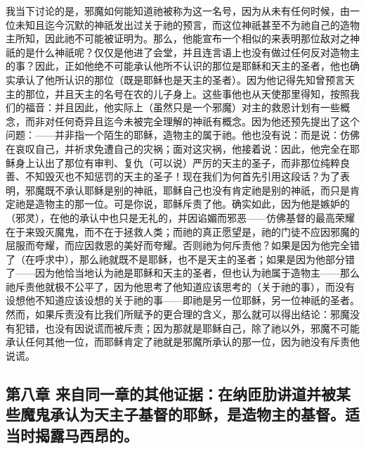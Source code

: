 我当下讨论的是，邪魔如何能知道祂被称为这一名号，因为从未有任何时候，由一位未知且迄今沉默的神祇发出过关于祂的预言，而这位神祇甚至不为祂自己的造物主所知，因此祂不可能被证明为。那么，他能宣布一个相似的来表明那位敌对之神祇的是什么神祇呢？仅仅是他进了会堂，并且连言语上也没有做过任何反对造物主的事？因此，正如他绝不可能承认他所不认识的那位是耶稣和天主的圣者，他也确实承认了他所认识的那位（既是耶稣也是天主的圣者）。因为他记得先知曾预言天主的那位，并且天主的名号在农的儿子身上。这些事他也从天使那里得知，按照我们的福音：并且因此，他实际上（虽然只是一个邪魔）对主的救恩计划有一些概念，而非对任何奇异且迄今未被完全理解的神祇有概念。因为他还预先提出了这个问题：——并非指一个陌生的耶稣，造物主的属于祂。他也没有说：而是说：仿佛在哀叹自己，并祈求免遭自己的灾祸；面对这灾祸，他接着说：因此，他完全在耶稣身上认出了那位有审判、复仇（可以说）严厉的天主的圣子，而非那位纯粹良善、不知毁灭也不知惩罚的天主的圣子！现在我们为何首先引用这段话？为了表明，邪魔既不承认耶稣是别的神祇，耶稣自己也没有肯定祂是别的神祇，而只是肯定祂是造物主的那一位。可是你说，耶稣斥责了他。确实如此，因为他是嫉妒的（邪灵），在他的承认中也只是无礼的，并因谄媚而邪恶——仿佛基督的最高荣耀在于来毁灭魔鬼，而不在于拯救人类；而祂的真正愿望是，祂的门徒不应因邪魔的屈服而夸耀，而应因救恩的美好而夸耀。否则祂为何斥责他？如果是因为他完全错了（在呼求中），那么祂就既不是耶稣，也不是天主的圣者；如果是因为他部分错了——因为他恰当地认为祂是耶稣和天主的圣者，但也认为祂属于造物主——那么祂斥责他就极不公平了，因为他思考了他知道应该思考的（关于祂的事），而没有设想他不知道应该设想的关于祂的事——即祂是另一位耶稣，另一位神祇的圣者。然而，如果斥责没有比我们所赋予的更合理的含义，那么就可以得出结论：邪魔没有犯错，也没有因说谎而被斥责；因为那就是耶稣自己，除了祂以外，邪魔不可能承认任何其他一位，而耶稣肯定了祂就是邪魔所承认的那一位，因为祂没有斥责他说谎。\par


\subsection{第八章 来自同一章的其他证据：在纳匝肋讲道并被某些魔鬼承认为天主子基督的耶稣，是造物主的基督。适当时揭露马西昂的。}


